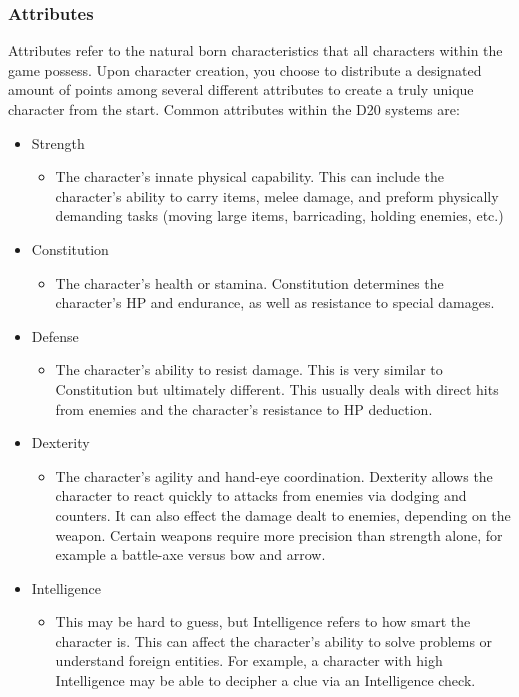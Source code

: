 \documentclass[12pt,a4paper]{report}
\begin{document}
		\subsubsection{Attributes}
			Attributes refer to the natural born characteristics that all characters within the game possess. Upon character creation, you choose to distribute a designated amount of points among several different attributes to create a truly unique character from the start. 
			Common attributes within the D20 systems are:
		\begin{itemize}
			\item Strength
			\begin{itemize}
				\item The character's innate physical capability. This can include the character's ability to carry items, melee damage, and preform physically demanding tasks (moving large items, barricading, holding enemies, etc.)
			\end{itemize}
			\item Constitution
			\begin{itemize}
				\item The character's health or stamina. Constitution determines the character's HP and endurance, as well as resistance to special damages. 
			\end{itemize}
			\item Defense
			\begin{itemize}
				\item The character's ability to resist damage. This is very similar to Constitution but ultimately different. This usually deals with direct hits from enemies and the character's resistance to HP deduction.
			\end{itemize}
			\item Dexterity
			\begin{itemize}
				\item The character's agility and hand-eye coordination. Dexterity allows the character to react quickly to attacks from enemies via dodging and counters. It can also effect the damage dealt to enemies, depending on the weapon. Certain weapons require more precision than strength alone, for example a battle-axe versus bow and arrow.
			\end{itemize}
			\item Intelligence
			\begin{itemize}
				\item This may be hard to guess, but Intelligence refers to how smart the character is. This can affect the character's ability to solve problems or understand foreign entities. For example, a character with high Intelligence may be able to decipher a clue via an Intelligence check.

\end{itemize}
\end{itemize}
\end{document}
